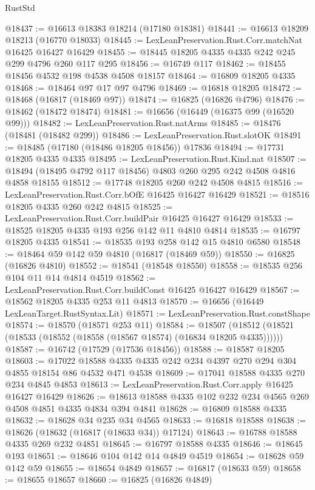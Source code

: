 \begin{lexlean}{RustStd}
\begin{coremodule}
@18437 := @16613 @18383 @18214 (@17180 @18381)
@18441 := @16613 @18209 @18213 (@16770 @18033)
@18445 := LexLeanPreservation.Rust.Corr.matchNat @16425 @16427 @16429
@18455 := @18445 @18205 @4335 @4335 @242 @245 @299 @4796 @260 @117 @295
@18456 := @16749 @117
@18462 := @18455 @18456 @4532 @198 @4538 @4508 @18157
@18464 := @16809 @18205 @4335
@18468 := @18464 @97 @17 @97 @4796
@18469 := @16818 @18205
@18472 := @18468 (@16817 (@18469 @97))
@18474 := @16825 (@16826 @4796)
@18476 := @18462 (@18472 @18474)
@18481 := @16656 (@16449 (@16375 @99 (@16520 @99)))
@18482 := LexLeanPreservation.Rust.natArms
@18485 := @18476 (@18481 (@18482 @299))
@18486 := LexLeanPreservation.Rust.slotOK
@18491 := @18485 (@17180 (@18486 @18205 @18456)) @17836
@18494 := @17731 @18205 @4335 @4335
@18495 := LexLeanPreservation.Rust.Kind.nat
@18507 := @18494 (@18495 @4792 @117 @18456) @4803 @260 @295 @242 @4508 @4816 @4858 @18155
@18512 := @17748 @18205 @260 @242 @4508 @4815
@18516 := LexLeanPreservation.Rust.Corr.bOfE @16425 @16427 @16429
@18521 := @18516 @18205 @4335 @260 @242 @4815
@18525 := LexLeanPreservation.Rust.Corr.buildPair @16425 @16427 @16429
@18533 := @18525 @18205 @4335 @193 @256 @142 @11 @4810 @4814
@18535 := @16797 @18205 @4335
@18541 := @18535 @193 @258 @142 @15 @4810 @6580
@18548 := @18464 @59 @142 @59 @4810 (@16817 (@18469 @59))
@18550 := @16825 (@16826 @4810)
@18552 := @18541 (@18548 @18550)
@18558 := @18535 @256 @104 @11 @14 @4814 @4519
@18562 := LexLeanPreservation.Rust.Corr.buildConst @16425 @16427 @16429
@18567 := @18562 @18205 @4335 @253 @11 @4813
@18570 := @16656 (@16449 LexLeanTarget.RustSyntax.Lit)
@18571 := LexLeanPreservation.Rust.constShape
@18574 := @18570 (@18571 @253 @11)
@18584 := @18507 (@18512 (@18521 (@18533 (@18552 (@18558 (@18567 @18574) (@16834 @18205 @4335))))))
@18587 := @16742 (@17529 (@17536 @18456))
@18588 := @18587 @18205
@18603 := @17022 @18588 @4335 @4335 @242 @234 @4397 @270 @294 @304 @4855 @18154 @86 @4532 @471 @4538
@18609 := @17041 @18588 @4335 @270 @234 @4845 @4853
@18613 := LexLeanPreservation.Rust.Corr.apply @16425 @16427 @16429
@18626 := @18613 @18588 @4335 @102 @232 @234 @4565 @269 @4508 @4851 @4335 @4834 @394 @4841
@18628 := @16809 @18588 @4335
@18632 := @18628 @34 @235 @34 @4565
@18633 := @16818 @18588
@18638 := @18626 (@18632 (@16817 (@18633 @34)) @17124)
@18643 := @16788 @18588 @4335 @269 @232 @4851
@18645 := @16797 @18588 @4335
@18646 := @18645 @193
@18651 := @18646 @104 @142 @14 @4849 @4519
@18654 := @18628 @59 @142 @59
@18655 := @18654 @4849
@18657 := @16817 (@18633 @59)
@18658 := @18655 @18657
@18660 := @16825 (@16826 @4849)

\end{coremodule}
\end{lexlean}
